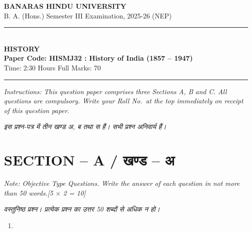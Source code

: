 \documentclass[11pt,a4paper]{article}
\newcommand{\pts}[1]{\hfill \textit{[#1]}}
\begin{document}
\begin{center}
  {\large\bfseries BANARAS HINDU UNIVERSITY}\\[2pt]
  {\normalsize B. A. (Hons.) Semester III Examination, 2025-26 (NEP)}\\[6pt]
  \rule{0.8\linewidth}{0.5pt}\\[6pt]
  {\large\bfseries HISTORY}\\[4pt]
  {\large\bfseries Paper Code: HISMJ32 : History of India (1857 -- 1947)}\\[4pt]
  {\normalsize Time: 2:30 Hours \hfill Full Marks: 70}
\end{center}
\rule{\linewidth}{0.4pt}
\smallskip

\noindent \textit{Instructions: This question paper comprises three Sections A, B and C. All questions are compulsory. Write your Roll No.\ at the top immediately on receipt of this question paper.}

\smallskip
\noindent \textit{इस प्रश्न-पत्र में तीन खण्ड अ, ब तथा स हैं। सभी प्रश्न अनिवार्य हैं।}

\bigskip

\section*{SECTION -- A / खण्ड -- अ}
\noindent \textit{Note: Objective Type Questions. Write the answer of each question in not more than 50 words.}\pts{5 $\times$ 2 = 10}

\noindent \textit{वस्तुनिष्ठ प्रश्न। प्रत्येक प्रश्न का उत्तर 50 शब्दों से अधिक न हो।}

\begin{enumerate}[label=\textbf{\arabic*.},leftmargin=*,itemsep=8pt]
  \item 
\end{enumerate}
\end{document}
